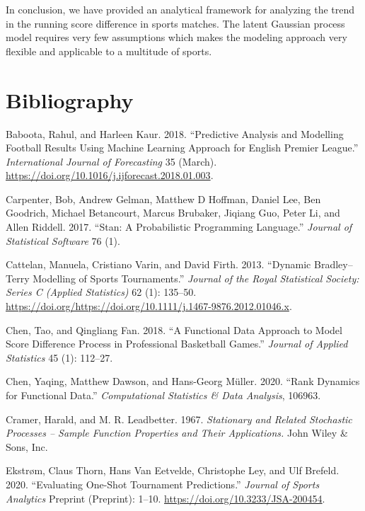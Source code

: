 \documentclass[
  11pt,
]{svjour3}
\theoremstyle{nonumberplain}
\begin{document}
In conclusion, we have provided an analytical framework for analyzing
the trend in the running score difference in sports matches. The latent
Gaussian process model requires very few assumptions which makes the
modeling approach very flexible and applicable to a multitude of sports.

\hypertarget{bibliography}{%
\section*{Bibliography}\label{bibliography}}

\hypertarget{refs}{}
\leavevmode\hypertarget{ref-baboota}{}%
Baboota, Rahul, and Harleen Kaur. 2018. ``Predictive Analysis and
Modelling Football Results Using Machine Learning Approach for English
Premier League.'' \emph{International Journal of Forecasting} 35
(March). \url{https://doi.org/10.1016/j.ijforecast.2018.01.003}.

\leavevmode\hypertarget{ref-carpenter2017stan}{}%
Carpenter, Bob, Andrew Gelman, Matthew D Hoffman, Daniel Lee, Ben
Goodrich, Michael Betancourt, Marcus Brubaker, Jiqiang Guo, Peter Li,
and Allen Riddell. 2017. ``Stan: A Probabilistic Programming Language.''
\emph{Journal of Statistical Software} 76 (1).

\leavevmode\hypertarget{ref-cattelan2013bradley}{}%
Cattelan, Manuela, Cristiano Varin, and David Firth. 2013. ``Dynamic
Bradley--Terry Modelling of Sports Tournaments.'' \emph{Journal of the
Royal Statistical Society: Series C (Applied Statistics)} 62 (1):
135--50.
\url{https://doi.org/https://doi.org/10.1111/j.1467-9876.2012.01046.x}.

\leavevmode\hypertarget{ref-chen2018functional}{}%
Chen, Tao, and Qingliang Fan. 2018. ``A Functional Data Approach to
Model Score Difference Process in Professional Basketball Games.''
\emph{Journal of Applied Statistics} 45 (1): 112--27.

\leavevmode\hypertarget{ref-chen2020rank}{}%
Chen, Yaqing, Matthew Dawson, and Hans-Georg Müller. 2020. ``Rank
Dynamics for Functional Data.'' \emph{Computational Statistics \& Data
Analysis}, 106963.

\leavevmode\hypertarget{ref-cramer1967stationary}{}%
Cramer, Harald, and M. R. Leadbetter. 1967. \emph{Stationary and Related
Stochastic Processes -- Sample Function Properties and Their
Applications.} John Wiley \& Sons, Inc.

\leavevmode\hypertarget{ref-ekstrom2020trps}{}%
Ekstrøm, Claus Thorn, Hans Van Eetvelde, Christophe Ley, and Ulf
Brefeld. 2020. ``Evaluating One-Shot Tournament Predictions.''
\emph{Journal of Sports Analytics} Preprint (Preprint): 1--10.
\url{https://doi.org/10.3233/JSA-200454}.
\end{document}
